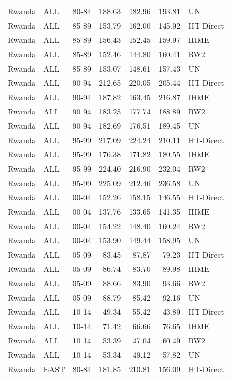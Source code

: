 \begin{longtable}{lllrrrl}
  Rwanda & ALL & 80-84 & 188.63 & 182.96 & 193.81 & UN \\ 
  Rwanda & ALL & 85-89 & 153.79 & 162.00 & 145.92 & HT-Direct \\ 
  Rwanda & ALL & 85-89 & 156.43 & 152.45 & 159.97 & IHME \\ 
  Rwanda & ALL & 85-89 & 152.46 & 144.80 & 160.41 & RW2 \\ 
  Rwanda & ALL & 85-89 & 153.07 & 148.61 & 157.43 & UN \\ 
  Rwanda & ALL & 90-94 & 212.65 & 220.05 & 205.44 & HT-Direct \\ 
  Rwanda & ALL & 90-94 & 187.82 & 163.45 & 216.87 & IHME \\ 
  Rwanda & ALL & 90-94 & 183.25 & 177.74 & 188.89 & RW2 \\ 
  Rwanda & ALL & 90-94 & 182.69 & 176.51 & 189.45 & UN \\ 
  Rwanda & ALL & 95-99 & 217.09 & 224.24 & 210.11 & HT-Direct \\ 
  Rwanda & ALL & 95-99 & 176.38 & 171.82 & 180.55 & IHME \\ 
  Rwanda & ALL & 95-99 & 224.40 & 216.90 & 232.04 & RW2 \\ 
  Rwanda & ALL & 95-99 & 225.09 & 212.46 & 236.58 & UN \\ 
  Rwanda & ALL & 00-04 & 152.26 & 158.15 & 146.55 & HT-Direct \\ 
  Rwanda & ALL & 00-04 & 137.76 & 133.65 & 141.35 & IHME \\ 
  Rwanda & ALL & 00-04 & 154.22 & 148.40 & 160.24 & RW2 \\ 
  Rwanda & ALL & 00-04 & 153.90 & 149.44 & 158.95 & UN \\ 
  Rwanda & ALL & 05-09 & 83.45 & 87.87 & 79.23 & HT-Direct \\ 
  Rwanda & ALL & 05-09 & 86.74 & 83.70 & 89.98 & IHME \\ 
  Rwanda & ALL & 05-09 & 88.66 & 83.90 & 93.66 & RW2 \\ 
  Rwanda & ALL & 05-09 & 88.79 & 85.42 & 92.16 & UN \\ 
  Rwanda & ALL & 10-14 & 49.34 & 55.42 & 43.89 & HT-Direct \\ 
  Rwanda & ALL & 10-14 & 71.42 & 66.66 & 76.65 & IHME \\ 
  Rwanda & ALL & 10-14 & 53.39 & 47.04 & 60.49 & RW2 \\ 
  Rwanda & ALL & 10-14 & 53.34 & 49.12 & 57.82 & UN \\ 
  Rwanda & EAST & 80-84 & 181.85 & 210.81 & 156.09 & HT-Direct \\ 

\end{longtable}
